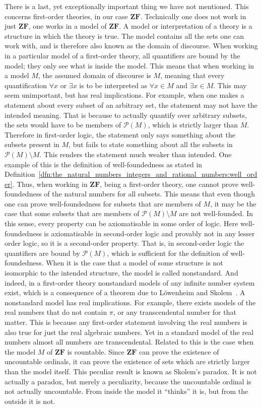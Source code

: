 \documentclass[../main.tex]{subfiles}
\begin{document}
There is a last, yet exceptionally important thing we have not mentioned. This concerns first-order theories, in our case $\mathbf{ZF}$. Technically one does not work in just $\mathbf{ZF}$, one works in a model of $\mathbf{ZF}$. A model or interpretation of a theory is a structure in which the theory is true. The model contains all the sets one can work with, and is therefore also known as the domain of discourse. When working in a particular model of a first-order theory, all quantifiers are bound by the model; they only see what is inside the model. This means that when working in a model $M$, the assumed domain of discourse is $M$, meaning that every quantification $\forall x$ or $\exists x$ is to be interpreted as $\forall x\in M$ and $\exists x\in M$. This may seem unimportant, but has real implications. For example, when one makes a statement about every subset of an arbitrary set, the statement may not have the intended meaning. That is because to actually quantify over arbitrary subsets, the sets would have to be members of $\mathcal{P}(M)$, which is strictly larger than $M$. Therefore in first-order logic, the statement only says something about the subsets present in $M$, but fails to state something about all the subsets in $\mathcal{P}(M)\setminus M$. This renders the statement much weaker than intended. One example of this is the definition of well-foundedness as stated in Definition~\ref{dfn:the_natural_numbers_integers_and_rational_numbers:well_order}. Thus, when working in $\mathbf{ZF}$, being a first-order theory, one cannot prove well-foundedness of the natural numbers for all subsets. This means that even though one can prove well-foundedness for subsets that are members of $M$, it may be the case that some subsets that are members of $\mathcal{P}(M)\setminus M$ are not well-founded. In this sense, every property can be axiomatisable in some order of logic. Here well-foundedness is axiomatisable in second-order logic and provably not in any lesser order logic, so it is a second-order property. That is, in second-order logic the quantifiers are bound by $\mathcal{P}(M)$, which is sufficient for the definition of well-foundedness. When it is the case that a model of some structure is not isomorphic to the intended structure, the model is called nonstandard. And indeed, in a first-order theory nonstandard models of any infinite number system exist, which is a consequence of a theorem due to Löwenheim and Skolem~\cite{Skolem1934}. A nonstandard model has real implications. For example, there exists models of the real numbers that do not contain $\pi$, or any transcendental number for that matter. This is because any first-order statement involving the real numbers is also true for just the real algebraic numbers. Yet in a standard model of the real numbers almost all numbers are transcendental. Related to this is the case when the model $M$ of $\mathbf{ZF}$ is countable. Since $\mathbf{ZF}$ can prove the existence of uncountable ordinals, it can prove the existence of sets which are strictly larger than the model itself. This peculiar result is known as Skolem's paradox. It is not actually a paradox, but merely a peculiarity, because the uncountable ordinal is not actually uncountable. From inside the model it ``thinks'' it is, but from the outside it is not.
\end{document}
